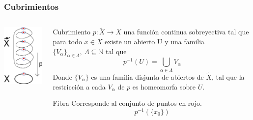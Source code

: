 \documentclass[xetex,mathserif,serif]{beamer}
\begin{document}
  \begin{frame}
    \frametitle{Cubrimientos}
    \begin{columns}
      \begin{column}{0.3\textwidth}
        \centering
        \includegraphics[scale=.8]{../tesis/imagenes/spring.png}
      \end{column}
      \begin{column}{0.7\textwidth}
        \begin{block}{Cubrimiento}
          \(p : \tilde{X} \to X\) una función continua sobreyectiva tal
          que para todo \(x \in X\) existe un abierto U y una familia
          \(\{V_\alpha\}_{\alpha \in \Lambda},\ \Lambda \subseteq \mathbb N\) tal
          que
          \[ p^{-1} (U) = \bigcup_{\alpha \in \Lambda} V_\alpha \]
          Donde \(\{V_\alpha\}\) es una familia disjunta de abiertos de
          \(\tilde X\), tal que
          la restricción a cada \(V_\alpha\) de \(p\) es
          homeomorfa sobre \(U\).
        \end{block}
        \begin{block}{Fibra}
          Corresponde al conjunto de puntos en rojo.
          \[ p^{-1} \left( \{x_0\} \right) \]
        \end{block}
      \end{column}
    \end{columns}
  \end{frame}
\end{document}
